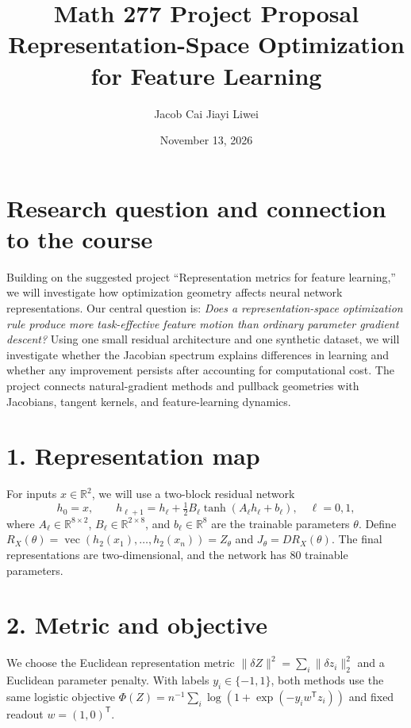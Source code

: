 \documentclass[11pt]{article}
\title{\vspace{-1.5em}\large Math 277 Project Proposal\\[0.5em]
  \LARGE Representation-Space Optimization\\
  for Feature Learning}
\author{Jacob Cai \qquad Jiayi Liwei}
\date{November 13, 2026}
\begin{document}
\maketitle
\vspace{-1.5em}

\section*{Research question and connection to the course}

Building on the suggested project ``Representation metrics for feature
learning,'' we will investigate how optimization geometry affects neural
network representations. Our central question is:
\emph{Does a representation-space optimization rule produce more task-effective
feature motion than ordinary parameter gradient descent?}
Using one small residual architecture and one synthetic dataset, we will
investigate whether the Jacobian spectrum explains differences in learning
and whether any improvement persists after accounting for computational cost.
The project connects natural-gradient methods and pullback geometries
\cite{martens2020,arbel2020} with Jacobians, tangent kernels, and
feature-learning dynamics.

\section*{1. Representation map}

For inputs $x\in\mathbb R^2$, we will use a two-block residual network
\[
 h_0=x,\qquad
 h_{\ell+1}=h_\ell+\tfrac12 B_\ell\tanh(A_\ell h_\ell+b_\ell),
 \quad \ell=0,1,
\]
where $A_\ell\in\mathbb R^{8\times2}$,
$B_\ell\in\mathbb R^{2\times8}$, and $b_\ell\in\mathbb R^8$ are the
trainable parameters $\theta$. Define
$R_X(\theta)=\operatorname{vec}(h_2(x_1),\ldots,h_2(x_n))=Z_\theta$
and $J_\theta=DR_X(\theta)$. The final representations are two-dimensional,
and the network has 80 trainable parameters.

\section*{2. Metric and objective}

We choose the Euclidean representation metric
$\|\delta Z\|^2=\sum_i\|\delta z_i\|_2^2$ and a Euclidean parameter
penalty. With labels $y_i\in\{-1,1\}$, both methods use the same logistic
objective
$\Phi(Z)=n^{-1}\sum_i\log(1+\exp(-y_i w^{\mathsf T}z_i))$
and fixed readout $w=(1,0)^{\mathsf T}$.
\end{document}
